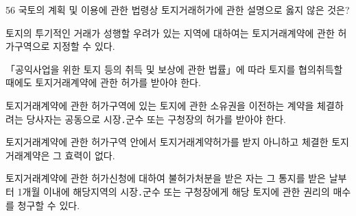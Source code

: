 \begin{question}{56}
국토의 계획 및 이용에 관한 법령상 토지거래허가에 관한 설명으로 옳지 않은 것은?
\begin{choices}
  \item 토지의 투기적인 거래가 성행할 우려가 있는 지역에 대하여는 토지거래계약에 관한 허가구역으로 지정할 수 있다.
  \item 「공익사업을 위한 토지 등의 취득 및 보상에 관한 법률」에 따라 토지를 협의취득할 때에도 토지거래계약에 관한 허가를 받아야 한다.
  \item 토지거래계약에 관한 허가구역에 있는 토지에 관한 소유권을 이전하는 계약을 체결하려는 당사자는 공동으로 시장․군수 또는 구청장의 허가를 받아야 한다.
  \item 토지거래계약에 관한 허가구역 안에서 토지거래계약허가를 받지 아니하고 체결한 토지거래계약은 그 효력이 없다.
  \item 토지거래계약에 관한 허가신청에 대하여 불허가처분을 받은 자는 그 통지를 받은 날부터 1개월 이내에 해당지역의 시장․군수 또는 구청장에게 해당 토지에 관한 권리의 매수를 청구할 수 있다.
\end{choices}
\end{question}

